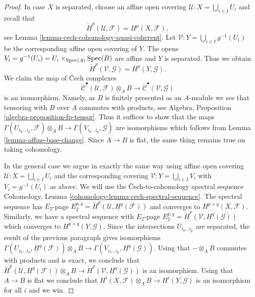 \begin{proof}
In case $X$ is separated, choose an affine open covering
$\mathcal{U} : X = \bigcup_{i \in I} U_i$ and recall that
$$
\check{H}^p(\mathcal{U}, \mathcal{F}) = H^p(X, \mathcal{F}),
$$
see
Lemma \ref{lemma-cech-cohomology-quasi-coherent}.
Let $\mathcal{V} : Y = \bigcup_{i \in I} g^{-1}(U_i)$
be the corresponding affine open covering of $Y$.
The opens $V_i = g^{-1}(U_i) = U_i \times_{\mathop{\mathrm{Spec}}(A)} \mathop{\mathrm{Spec}}(B)$
are affine and $Y$ is separated. Thus we obtain
$$
\check{H}^p(\mathcal{V}, \mathcal{G}) = H^p(Y, \mathcal{G}).
$$
We claim the map of {\v C}ech complexes
$$
\check{\mathcal{C}}^\bullet(\mathcal{U}, \mathcal{F}) \otimes_A B
\longrightarrow
\check{\mathcal{C}}^\bullet(\mathcal{V}, \mathcal{G})
$$
is an isomorphism. Namely, as $B$ is finitely presented as an $A$-module
we see that tensoring with $B$ over $A$ commutes with products, see
Algebra, Proposition \ref{algebra-proposition-fp-tensor}.
Thus it suffices to show that the maps
$\Gamma(U_{i_0 \ldots i_p}, \mathcal{F}) \otimes_A B \to
\Gamma(V_{i_0 \ldots i_p}, \mathcal{G})$ 
are isomorphisms which follows from
Lemma \ref{lemma-affine-base-change}.
Since $A \to B$ is flat, the same thing remains true on taking cohomology.

\medskip\noindent
In the general case we argue in exactly the same way using affine
open covering $\mathcal{U} : X = \bigcup_{i \in I} U_i$ and the
corresponding covering $\mathcal{V} : Y = \bigcup_{i \in I} V_i$
with $V_i = g^{-1}(U_i)$ as above. We will use the
{\v C}ech-to-cohomology spectral sequence
Cohomology, Lemma \ref{cohomology-lemma-cech-spectral-sequence}.
The spectral sequence has $E_2$-page
$E_2^{p, q} = \check{H}^p(\mathcal{U}, \underline{H}^q(\mathcal{F}))$
and converges to $H^{p + q}(X, \mathcal{F})$.
Similarly, we have a spectral sequence with $E_2$-page
$E_2^{p, q} = \check{H}^p(\mathcal{V}, \underline{H}^q(\mathcal{G}))$
which converges to $H^{p + q}(Y, \mathcal{G})$.
Since the intersections $U_{i_0 \ldots i_p}$ are separated, the result
of the previous paragraph gives isomorphisms
$\Gamma(U_{i_0 \ldots i_p}, \underline{H}^q(\mathcal{F})) \otimes_A B
\to \Gamma(V_{i_0 \ldots i_p}, \underline{H}^q(\mathcal{G}))$.
Using that $- \otimes_A B$ commutes with products and is exact, we conclude
that
$\check{H}^p(\mathcal{U}, \underline{H}^q(\mathcal{F})) \otimes_A B
\to \check{H}^p(\mathcal{V}, \underline{H}^q(\mathcal{G}))$
is an isomorphism. Using that $A \to B$ is flat we conclude that
$H^i(X, \mathcal{F}) \otimes_A B \to H^i(Y, \mathcal{G})$
is an isomorphism for all $i$ and we win.
\end{proof}









